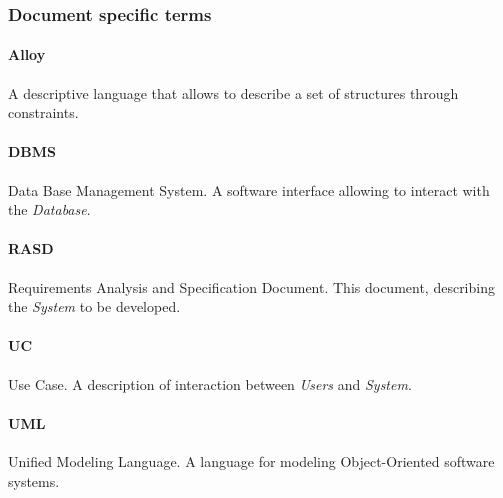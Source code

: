\subsubsection{Document specific terms}
\paragraph{Alloy}
A descriptive language that allows to describe a set of structures through constraints.
\paragraph{DBMS}
Data Base Management System. A software interface allowing to interact with the \emph{Database}.
\paragraph{RASD}
Requirements Analysis and Specification Document. This document, describing the \emph{System} to be developed.
\paragraph{UC}
Use Case. A description of interaction between \emph{Users} and \emph{System}.
\paragraph{UML}
Unified Modeling Language. A language for modeling Object-Oriented software systems.